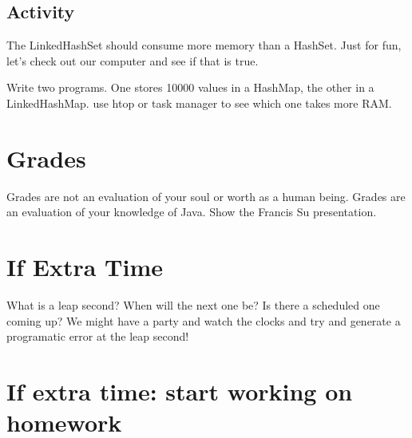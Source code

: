 \documentclass[12pt]{article}
\begin{document}
\subsection{Activity}
The LinkedHashSet should consume more memory than a HashSet. Just for fun, let's check out our computer and see if that is true.

Write two programs. One stores 10000 values in a HashMap, the other in a LinkedHashMap. use htop or task manager to see which one takes more RAM.


\section{Grades}
Grades are not an evaluation of your soul or worth as a human being. Grades are an evaluation of your knowledge of Java.  Show the Francis Su presentation.

\section{If Extra Time}
What is a leap second? When will the next one be? Is there a scheduled one coming up? We might have a party and watch the clocks and try and generate a programatic error at the leap second!

\section{If extra time: start working on homework}
\end{document}
